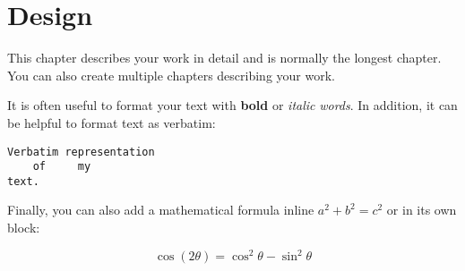 \chapter{Design}
\label{cha:design}

This chapter describes your work in detail and is normally the longest chapter.
You can also create multiple chapters describing your work.

It is often useful to format your text with \textbf{bold} or \textit{italic}
\emph{words}. In addition, it can be helpful to format text as verbatim:

\begin{verbatim}
Verbatim representation
    of     my
text.
\end{verbatim}

Finally, you can also add a mathematical formula inline $a^2 + b^2 = c^2$ or in
its own block:

\begin{equation}
    \cos (2\theta) = \cos^2 \theta - \sin^2 \theta
\end{equation}
